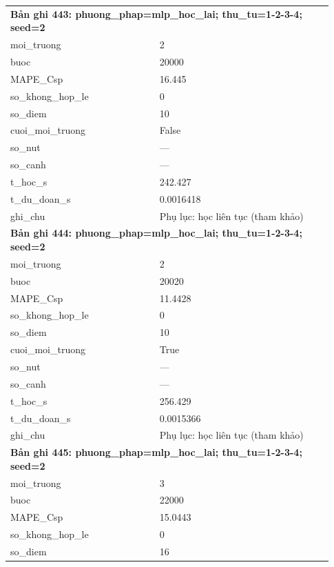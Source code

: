 \begin{longtable}{p{0.43\linewidth}p{0.50\linewidth}}
\midrule
\multicolumn{2}{p{0.95\linewidth}}{\textbf{Bản ghi 443: phuong\_phap=mlp\_hoc\_lai; thu\_tu=1-2-3-4; seed=2}} \\
moi\_\allowbreak truong & 2 \\
buoc & 20000 \\
MAPE\_\allowbreak Csp & 16.445 \\
so\_\allowbreak khong\_\allowbreak hop\_\allowbreak le & 0 \\
so\_\allowbreak diem & 10 \\
cuoi\_\allowbreak moi\_\allowbreak truong & False \\
so\_\allowbreak nut & — \\
so\_\allowbreak canh & — \\
t\_\allowbreak hoc\_\allowbreak s & 242.427 \\
t\_\allowbreak du\_\allowbreak doan\_\allowbreak s & 0.0016418 \\
ghi\_\allowbreak chu & Phụ lục: học liên tục (tham khảo) \\
\midrule
\multicolumn{2}{p{0.95\linewidth}}{\textbf{Bản ghi 444: phuong\_phap=mlp\_hoc\_lai; thu\_tu=1-2-3-4; seed=2}} \\
moi\_\allowbreak truong & 2 \\
buoc & 20020 \\
MAPE\_\allowbreak Csp & 11.4428 \\
so\_\allowbreak khong\_\allowbreak hop\_\allowbreak le & 0 \\
so\_\allowbreak diem & 10 \\
cuoi\_\allowbreak moi\_\allowbreak truong & True \\
so\_\allowbreak nut & — \\
so\_\allowbreak canh & — \\
t\_\allowbreak hoc\_\allowbreak s & 256.429 \\
t\_\allowbreak du\_\allowbreak doan\_\allowbreak s & 0.0015366 \\
ghi\_\allowbreak chu & Phụ lục: học liên tục (tham khảo) \\
\midrule
\multicolumn{2}{p{0.95\linewidth}}{\textbf{Bản ghi 445: phuong\_phap=mlp\_hoc\_lai; thu\_tu=1-2-3-4; seed=2}} \\
moi\_\allowbreak truong & 3 \\
buoc & 22000 \\
MAPE\_\allowbreak Csp & 15.0443 \\
so\_\allowbreak khong\_\allowbreak hop\_\allowbreak le & 0 \\
so\_\allowbreak diem & 16 \\

\end{longtable}
